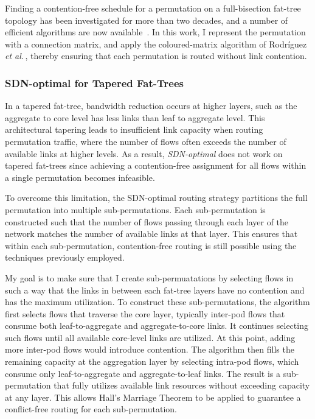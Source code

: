 Finding a contention-free schedule for a permutation on a full-bisection
fat-tree topology has been investigated for more than two decades, and a
number of efficient algorithms are now available\,%
\cite{Paull1962,Rodriguez2009,Zahavi2010,Prisacari2013}.  In this work, I
represent the permutation with a connection
matrix,\cite{Paull1962} and apply the coloured-matrix algorithm of
Rodríguez \emph{et al.}\,\cite{Rodriguez2009}, thereby ensuring that each
permutation is routed without link contention.

\subsubsection{SDN-optimal for Tapered Fat-Trees}

In a tapered fat-tree, bandwidth reduction occurs at higher layers,
such as the aggregate to core level has less links than leaf to aggregate
level. This architectural tapering leads to insufficient link capacity
when routing permutation traffic, where the number of flows often
exceeds the number of available links at higher levels.
As a result, \textit{SDN-optimal} does not work on tapered fat-trees
since achieving a contention-free assignment for all flows within a
single permutation becomes infeasible.

To overcome this limitation, the SDN-optimal routing strategy
partitions the full permutation into multiple sub-permutations.
Each sub-permutation is constructed such that the number of flows
passing through each layer of the network matches the number of
available links at that layer. This ensures that within each
sub-permutation, contention-free routing is still possible using
the techniques previously employed.

My goal is to make sure that I create sub-permuatations by
selecting flows in such a way that the links in between each
fat-tree layers have no contention and has the maximum utilization. 
To construct these sub-permutations, the algorithm first selects
flows that traverse the core layer, typically inter-pod flows that consume both leaf-to-aggregate and aggregate-to-core links. It continues selecting such flows until all available core-level links are utilized. At this point, adding more inter-pod flows would introduce contention. The algorithm then fills the remaining capacity at the aggregation layer by selecting intra-pod flows, which consume only leaf-to-aggregate and aggregate-to-leaf links. The result is a sub-permutation that fully utilizes available link resources without exceeding capacity at any layer. This allows Hall’s Marriage Theorem \cite{cameron2025hall} \cite{hall1987representatives} to be applied to guarantee a conflict-free routing for each sub-permutation.

